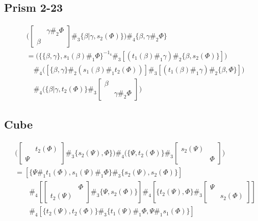 \documentclass[11pt, reqno]{amsart} %
\theoremstyle{definition}
\theoremstyle{remark}
\numberwithin{equation}{section}
\begin{document}
\subsection{Prism 2-23}
\begin{align}
  \nonumber
  &
  \bigl(
    \begin{bmatrix}& \gamma\#_2\Phi \\ \beta &\end{bmatrix}
    \#_3
    \{\beta|\gamma,s_2(\Phi)\}
  \bigr) 
  \#_4
  \{\beta,\gamma\#_2\Phi\} \\
  \nonumber
  &=
  \bigl(
    \{\{\beta,\gamma\},s_1(\beta)\#_1\Phi\}^{-1_4}
    \#_3
    [(t_1(\beta)\#_1\gamma)\#_2\{\beta,s_2(\Phi)\}]
  \bigr) \\
  \nonumber
  &\quad \#_4
  \bigl(
    [\{\beta,\gamma\}\#_2(s_1(\beta)\#_1t_2(\Phi))]
    \#_3
    [(t_1(\beta)\#_1\gamma)\#_2\{\beta,\Phi\}]
  \bigr) \\
  \label{eq:Prism2|23}
  &\quad \#_4
  \bigl(
    \{\beta|\gamma,t_2(\Phi)\}
    \#_3
    \begin{bmatrix}\beta & \\ & \gamma\#_2\Phi\end{bmatrix}
  \bigr)
\end{align}

\subsection{Cube} 
\begin{align}
  \nonumber
  &
  \bigl(
    \begin{bmatrix}& t_2(\Phi) \\ \Psi &\end{bmatrix}
    \#_3
    \{s_2(\Psi),\Phi\}
  \bigr)
  \#_4
  \bigl(
    \{\Psi,t_2(\Phi)\}
    \#_3
    \begin{bmatrix}s_2(\Psi) & \\ & \Phi\end{bmatrix}
  \bigr) \\
  \nonumber
  &= 
  [
    \{\Psi\#_1t_1(\Phi),s_1(\Psi)\#_1\Phi\}
    \#_3
    \{s_2(\Psi),s_2(\Phi)\}
  ] \\
  \nonumber
  &\qquad \#_4
  [
    \begin{bmatrix}& \Phi \\ t_2(\Psi) &\end{bmatrix}
    \#_3
    \{\Psi,s_2(\Phi)\}
  ] 
  \#_4
  [
    \{t_2(\Psi),\Phi\}
    \#_3
    \begin{bmatrix}\Psi & \\ & s_2(\Phi)\end{bmatrix}
  ] \\
  \label{eq:Cube}
  &\qquad \#_4
  [
    \{t_2(\Psi),t_2(\Phi)\}
    \#_3
    \{t_1(\Psi)\#_1\Phi,\Psi\#_1s_1(\Phi)\}
  ]
\end{align}
\end{document}
